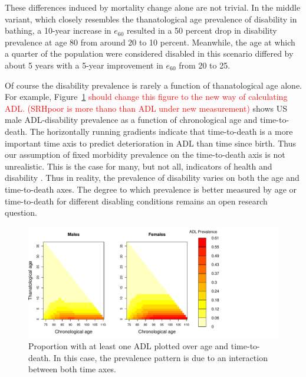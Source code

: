 \documentclass[11pt,oneside,a4paper]{article} %
\begin{document}
These differences induced by mortality change alone are not trivial. In the middle variant, which closely resembles the thanatological age prevalence of disability in bathing, a 10-year increase in $e_{60}$  resulted in a 50 percent drop in disability prevalence at age 80 from around 20 to 10 percent. Meanwhile, the age at which a quarter of the population were considered disabled in this scenario differed by about 5 years with a 5-year improvement in $e_{60}$ from 20 to 25.

Of course the disability prevalence is rarely a function of thanatological age
alone. For example, Figure~\ref{fig:Fig_ADL_thana-chrono_rev}
\textcolor{red}{should change this figure to the new way of calculating ADL.
(SRHpoor is more thano than ADL under new measurement)} shows US male
ADL-disability prevalence as a function of chronological age and time-to-death. The horizontally running gradients indicate that
time-to-death is a more important time axis to predict deterioration in ADL than
time since birth. Thus our assumption of fixed morbidity prevalence on the
time-to-death axis is not unrealistic. This is the case for many,
but not all, indicators of health and disability \citep{riffe2015ttd}. Thus in
reality, the prevalence of disability varies on both the age and
time-to-death axes. The degree to which prevalence is better measured by age or
time-to-death for different disabling conditions remains an open research
question.

\begin{figure}
\begin{adjustwidth}{-1.5cm}{}
	\centering
	\includegraphics[scale=.8]{Fig_ADL_thana-chrono_rev.pdf}
	\caption{Proportion with at least one ADL plotted over age and time-to-death.
	In this case, the prevalence pattern is due to an interaction between both
	time axes.}
	\label{fig:Fig_ADL_thana-chrono_rev}
\end{adjustwidth}
\end{figure}
\end{document}
